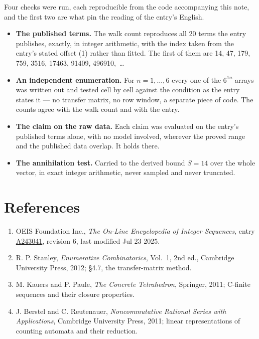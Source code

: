 \documentclass[11pt]{article}
\theoremstyle{definition}
\begin{document}
Four checks were run, each reproducible from the code accompanying this note, and the first two are what pin the reading of the entry's English.

\begin{itemize}

\item {\bfseries The published terms.} The walk count reproduces all 20 terms the entry publishes, exactly, in integer arithmetic, with the index taken from the entry's stated offset (1) rather than fitted. The first of them are 14, 47, 179, 759, 3516, 17463, 91409, 496910,~\dots

\item {\bfseries An independent enumeration.} For $n = 1,\dots,6$ every one of the $6^{1n}$ arrays was written out and tested cell by cell against the condition as the entry states it --- no transfer matrix, no row window, a separate piece of code. The counts agree with the walk count and with the entry.

\item {\bfseries The claim on the raw data.} Each claim was evaluated on the entry's published terms alone, with no model involved, wherever the proved range and the published data overlap. It holds there.

\item {\bfseries The annihilation test.} Carried to the derived bound $S = 14$ over the whole vector, in exact integer arithmetic, never sampled and never truncated.

\end{itemize}

\section{References}

\begin{enumerate}

\item OEIS Foundation Inc., \emph{The On-Line Encyclopedia of Integer Sequences}, entry \href{https://oeis.org/A243041}{A243041}, revision 6, last modified Jul 23 2025.

\item R. P. Stanley, \emph{Enumerative Combinatorics}, Vol.~1, 2nd ed., Cambridge University Press, 2012; \S4.7, the transfer-matrix method.

\item M. Kauers and P. Paule, \emph{The Concrete Tetrahedron}, Springer, 2011; C-finite sequences and their closure properties.

\item J. Berstel and C. Reutenauer, \emph{Noncommutative Rational Series with Applications}, Cambridge University Press, 2011; linear representations of counting automata and their reduction.

\end{enumerate}
\end{document}
